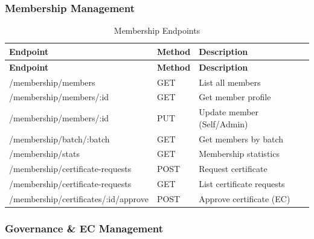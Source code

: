 \documentclass[12pt,a4paper]{article}
\begin{document}
\subsubsection{Membership Management}

\begin{longtable}{>{\small\ttfamily}p{6.9cm}%
                  >{\small\centering\arraybackslash}p{1.3cm}%
                  >{\small}p{6.7cm}}
\caption{Membership Endpoints} \\

\rowcolor{Teal}
\color{white}\normalfont\bfseries Endpoint & \color{white}\bfseries Method & \color{white}\bfseries Description \\
\endfirsthead
\rowcolor{Teal}
\color{white}\normalfont\bfseries Endpoint & \color{white}\bfseries Method & \color{white}\bfseries Description \\
\endhead

\midrule
\rowcolor{LightTeal}/membership/members & GET & List all members \\
/membership/members/:id & GET & Get member profile \\
\rowcolor{LightTeal}/membership/members/:id & PUT & Update member (Self/Admin) \\
/membership/batch/:batch & GET & Get members by batch \\
\rowcolor{LightTeal}/membership/stats & GET & Membership statistics \\
/membership/certificate-requests & POST & Request certificate \\
\rowcolor{LightTeal}/membership/certificate-requests & GET & List certificate requests \\
/membership/certificates/:id/approve & POST & Approve certificate (EC) \\
\bottomrule
\end{longtable}

\subsubsection{Governance \& EC Management}
\end{document}
